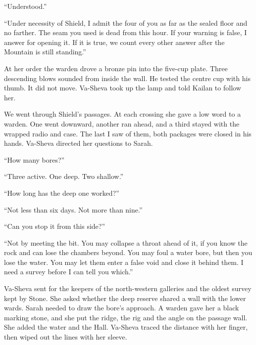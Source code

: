 ``Understood.''\par

``Under necessity of Shield, I admit the four of you as far as the sealed floor and no farther. The seam you used is dead from this hour. If your warning is false, I answer for opening it. If it is true, we count every other answer after the Mountain is still standing.''\par

At her order the warden drove a bronze pin into the five-cup plate. Three descending blows sounded from inside the wall. He tested the centre cup with his thumb. It did not move. Va-Sheva took up the lamp and told Kailan to follow her.\par

We went through Shield's passages. At each crossing she gave a low word to a warden. One went downward, another ran ahead, and a third stayed with the wrapped radio and case. The last I saw of them, both packages were closed in his hands. Va-Sheva directed her questions to Sarah.\par

``How many bores?''\par

``Three active. One deep. Two shallow.''\par

``How long has the deep one worked?''\par

``Not less than six days. Not more than nine.''\par

``Can you stop it from this side?''\par

``Not by meeting the bit. You may collapse a throat ahead of it, if you know the rock and can lose the chambers beyond. You may foul a water bore, but then you lose the water. You may let them enter a false void and close it behind them. I need a survey before I can tell you which.''\par

Va-Sheva sent for the keepers of the north-western galleries and the oldest survey kept by Stone. She asked whether the deep reserve shared a wall with the lower wards. Sarah needed to draw the bore's approach. A warden gave her a black marking stone, and she put the ridge, the rig and the angle on the passage wall. She added the water and the Hall. Va-Sheva traced the distance with her finger, then wiped out the lines with her sleeve.\par

